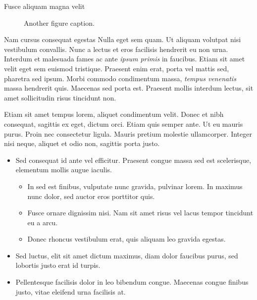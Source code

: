 \documentclass[final]{beamer}
\begin{document}
\begin{frame}[label={sec:orgd60d47b}]{}
\begin{columns}
\begin{column}{0.3\columnwidth}
\begin{block}{Fusce aliquam magna velit}
\begin{figure}
  \centering
  \caption{Another figure caption.}
\end{figure}
\end{block}

\begin{block}{Nam cursus consequat egestas}
Nulla eget sem quam. Ut aliquam volutpat nisi vestibulum convallis. Nunc a
lectus et eros facilisis hendrerit eu non urna. Interdum et malesuada fames ac
ante \emph{ipsum primis} in faucibus. Etiam sit amet velit eget sem euismod
tristique. Praesent enim erat, porta vel mattis sed, pharetra sed ipsum. Morbi
commodo condimentum massa, \emph{tempus venenatis} massa hendrerit quis. Maecenas sed
porta est. Praesent mollis interdum lectus, sit amet sollicitudin risus
tincidunt non.

Etiam sit amet tempus lorem, aliquet condimentum velit. Donec et nibh consequat,
sagittis ex eget, dictum orci. Etiam quis semper ante. Ut eu mauris purus. Proin
nec consectetur ligula. Mauris pretium molestie ullamcorper. Integer nisi neque,
aliquet et odio non, sagittis porta justo.

\begin{itemize}
\item \alert{Sed consequat} id ante vel efficitur. Praesent congue massa sed est
scelerisque, elementum mollis augue iaculis.
\begin{itemize}
\item In sed est finibus, vulputate nunc gravida, pulvinar lorem. In maximus nunc
dolor, sed auctor eros porttitor quis.
\item Fusce ornare dignissim nisi.  Nam sit amet risus vel lacus tempor tincidunt
eu a arcu.
\item Donec rhoncus vestibulum erat, quis aliquam leo gravida egestas.
\end{itemize}
\item \alert{Sed luctus, elit sit amet} dictum maximus, diam dolor faucibus purus, sed
lobortis justo erat id turpis.
\item \alert{Pellentesque facilisis dolor in leo} bibendum congue.  Maecenas congue
finibus justo, vitae eleifend urna facilisis at.
\end{itemize}


\end{block}
\end{column}
\end{columns}
\end{frame}
\end{document}
